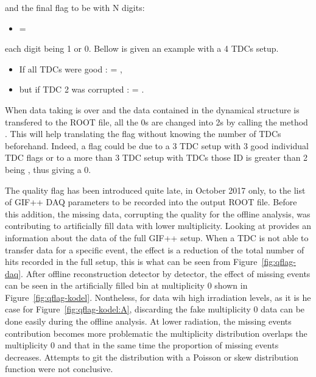 and the final flag to be with N digits:
	
	\begin{itemize}
		\item[]  = 
	\end{itemize}
	
each digit being 1 or 0. Bellow is given an example with a 4 TDCs setup.
	
	\begin{itemize}
		\item[] If all TDCs were good :  = ,
		\item[] but if TDC 2 was corrupted :  = .
	\end{itemize}
                        
	When data taking is over and the data contained in the dynamical  structure is transfered to the ROOT file, all the 0s are changed into 2s by calling the method . This will help translating the flag without knowing the number of TDCs beforehand. Indeed, a flag  could be due to a 3 TDC setup with 3 good individual TDC flags or to a more than 3 TDC setup with TDCs those ID is greater than 2 being , thus giving a 0.
	
	The quality flag has been introduced quite late, in October 2017 only, to the list of GIF++ DAQ parameters to be recorded into the output ROOT file. Before this addition, the missing data, corrupting the quality for the offline analysis, was contributing to artificially fill data with lower multiplicity. Looking at  provides an information about the data of the full GIF++ setup. When a TDC is not able to transfer data for a specific event, the effect is a reduction of the total number of hits recorded in the full setup, this is what can be seen from Figure~\ref{fig:qflag-daq}. After offline reconstruction detector by detector, the effect of missing events can be seen in the artificially filled bin at multiplicity 0 shown in Figure~\ref{fig:qflag-kodel}. Nontheless, for data wih high irradiation levels, as it is he case for Figure~\ref{fig:qflag-kodel:A}, discarding the fake multiplicity 0 data can be done easily during the offline analysis. At lower radiation, the missing events contribution becomes more problematic the multiplicity distribution overlaps the multiplicity 0 and that in the same time the proportion of missing events decreases. Attempts to git the distribution with a Poisson or skew distribution function were not conclusive.\\
	
